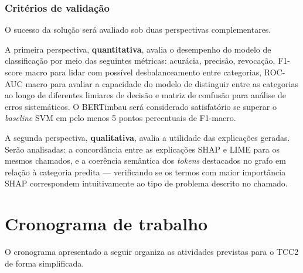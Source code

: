 \documentclass[
    12pt,                %
    openright,           %
    oneside,             %
    a4paper,             %
    english,             %
    brazil               %
]{abntex2}
\begin{document}
\subsubsection{Critérios de validação}

O sucesso da solução será avaliado sob duas perspectivas complementares.

A primeira perspectiva, \textbf{quantitativa}, avalia o desempenho do modelo de classificação por meio das seguintes métricas: acurácia, precisão, revocação, F1-score macro para lidar com possível desbalanceamento entre categorias, ROC-AUC macro para avaliar a capacidade do modelo de distinguir entre as categorias ao longo de 
diferentes limiares de decisão e matriz de confusão para análise de erros sistemáticos. O BERTimbau será considerado satisfatório se superar o \textit{baseline} SVM em pelo menos 5 pontos percentuais de F1-macro.

A segunda perspectiva, \textbf{qualitativa}, avalia a utilidade das explicações geradas. Serão analisadas: a concordância entre as explicações SHAP e LIME para os mesmos chamados, e a coerência semântica dos \textit{tokens} destacados no grafo em relação à categoria predita — verificando se os termos com maior importância SHAP correspondem intuitivamente ao tipo de problema descrito no chamado.

\section{Cronograma de trabalho}
\label{sec:cronograma}

O cronograma apresentado a seguir organiza as atividades previstas para o TCC2 de forma simplificada.
\end{document}
